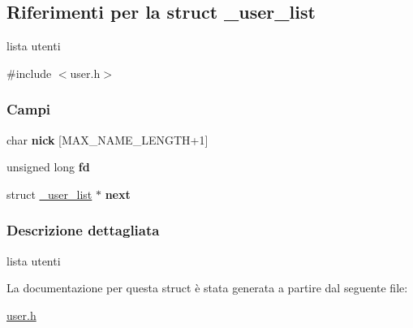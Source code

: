 \hypertarget{struct__user__list}{}\subsection{Riferimenti per la struct \+\_\+user\+\_\+list}
\label{struct__user__list}


lista utenti  




{\ttfamily \#include $<$user.\+h$>$}

\subsubsection*{Campi}
\begin{DoxyCompactItemize}
\item 
\mbox{\label{struct__user__list_a6260c9c921d8d506e637c126a3c3ca34}} 
char {\bfseries nick} \mbox{[}M\+A\+X\+\_\+\+N\+A\+M\+E\+\_\+\+L\+E\+N\+G\+TH+1\mbox{]}
\item 
\mbox{\label{struct__user__list_ad58458ef72ab348f9196674cab13bbc4}} 
unsigned long {\bfseries fd}
\item 
\mbox{\label{struct__user__list_a909c0c706131a2f8207f837a2c534a55}} 
struct \mbox{\hyperlink{struct__user__list}{\+\_\+user\+\_\+list}} $\ast$ {\bfseries next}
\end{DoxyCompactItemize}


\subsubsection{Descrizione dettagliata}
lista utenti 

La documentazione per questa struct è stata generata a partire dal seguente file\+:\begin{DoxyCompactItemize}
\item 
\mbox{\hyperlink{user_8h}{user.\+h}}\end{DoxyCompactItemize}
